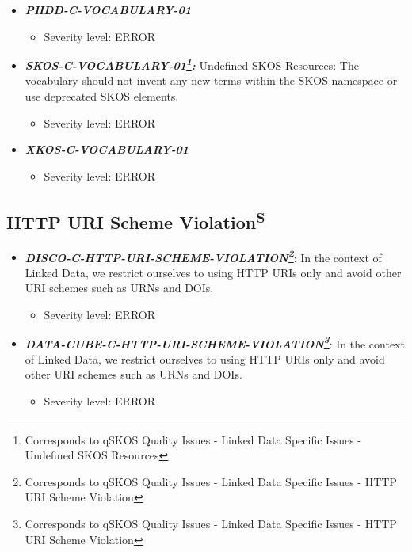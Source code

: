 \documentclass{llncs}
\begin{document}
\begin{itemize}
	\item \textbf{\em PHDD-C-VOCABULARY-01} 
	\begin{itemize}
		\item Severity level: ERROR
	\end{itemize}
\end{itemize}

\begin{itemize}
	\item \textbf{{\em SKOS-C-VOCABULARY-01\footnote{Corresponds to qSKOS Quality Issues - Linked Data Specific Issues - Undefined SKOS Resources}:}}
	Undefined SKOS Resources:
	The vocabulary should not invent any new terms within the SKOS namespace or use deprecated SKOS elements. 
	\begin{itemize}
		\item Severity level: ERROR
	\end{itemize}
\end{itemize}

\begin{itemize}
	\item \textbf{\em XKOS-C-VOCABULARY-01} 
	\begin{itemize}
		\item Severity level: ERROR
	\end{itemize}
\end{itemize}

\subsection{HTTP URI Scheme Violation\textsuperscript{S}}

\begin{itemize}
	\item \textbf{\em DISCO-C-HTTP-URI-SCHEME-VIOLATION\footnote{Corresponds to qSKOS Quality Issues - Linked Data Specific Issues - HTTP URI Scheme Violation}}: 
	In the context of Linked Data, we restrict ourselves to using HTTP URIs only and avoid other URI schemes such as URNs and DOIs.
	\begin{itemize}
		\item Severity level: ERROR
	\end{itemize}
\end{itemize}

\begin{itemize}
	\item \textbf{\em DATA-CUBE-C-HTTP-URI-SCHEME-VIOLATION\footnote{Corresponds to qSKOS Quality Issues - Linked Data Specific Issues - HTTP URI Scheme Violation}}: 
	In the context of Linked Data, we restrict ourselves to using HTTP URIs only and avoid other URI schemes such as URNs and DOIs.
	\begin{itemize}
		\item Severity level: ERROR
	\end{itemize}
\end{itemize}
\end{document}

